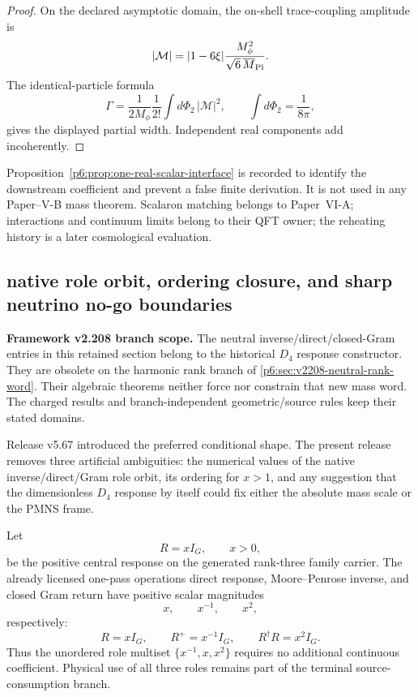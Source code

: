 \documentclass[12pt,a4paper]{article}
\begin{document}
\begin{proof}
On the declared asymptotic domain, the on-shell trace-coupling amplitude is
\[
|\mathcal M|
=
|1-6\xi|\frac{M_\phi^2}{\sqrt6\,\overline M_{\rm Pl}}.
\]
The identical-particle formula
\[
\Gamma
=
\frac1{2M_\phi}\frac1{2!}
\int d\Phi_2\,|\mathcal M|^2,
\qquad
\int d\Phi_2=\frac1{8\pi},
\]
gives the displayed partial width.  Independent real components add
incoherently.
\end{proof}

\begin{remark}
Proposition~\ref{p6:prop:one-real-scalar-interface} is recorded to identify
the downstream coefficient and prevent a false finite derivation.  It is not
used in any Paper--V-B mass theorem.  Scalaron matching belongs to Paper~VI-A;
interactions and continuum limits belong to their QFT owner; the reheating
history is a later cosmological evaluation.
\end{remark}

\subsection{native role orbit, ordering closure, and sharp neutrino no-go boundaries}
\label{p6:sec:v568-d4-neutrino-closure-refinement}

\noindent\textbf{Framework v2.208 branch scope.}
The neutral inverse/direct/closed-Gram entries in this retained section
belong to the historical $D_4$ response constructor. They are obsolete
on the harmonic rank branch of \ref{p6:sec:v2208-neutral-rank-word}.
Their algebraic theorems neither force nor constrain that new mass word.
The charged results and branch-independent geometric/source rules keep
their stated domains.


Release v5.67 introduced the preferred conditional shape.  The present
release removes three artificial ambiguities: the numerical values of the
native inverse/direct/Gram role orbit, its ordering for \(x>1\), and any
suggestion that the dimensionless \(D_4\) response by itself could fix either
the absolute mass scale or the PMNS frame.

\begin{proposition}
\label{p6:prop:v568-native-response-orbit}
Let
\[
 R=xI_G,\qquad x>0,
\]
be the positive central response on the generated rank-three family carrier.
The already licensed one-pass operations direct response, Moore--Penrose
inverse, and closed Gram return have positive scalar magnitudes
\[
 \boxed{x,\qquad x^{-1},\qquad x^2,}
\]
respectively:
\[
 R=xI_G,\qquad R^+=x^{-1}I_G,\qquad R^\dagger R=x^2I_G.
\]
Thus the unordered role multiset \(\{x^{-1},x,x^2\}\) requires no additional
continuous coefficient.  Physical use of all three roles remains part of the
terminal source-consumption branch.
\end{proposition}
\end{document}

